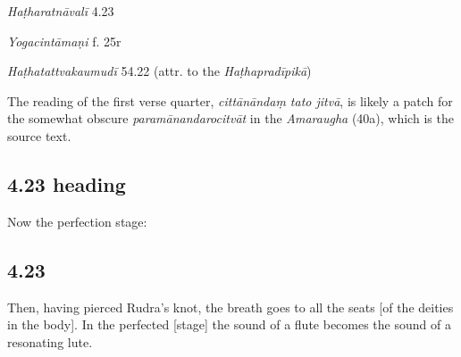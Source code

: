 \begin{ekdosis}
\begin{testimonia}[hp04_022]
\emph{Haṭharatnāvalī} 4.23
\begin{versinnote}
\end{versinnote}

\emph{Yogacintāmaṇi} f. 25r
\begin{versinnote}
\end{versinnote}

\emph{Haṭhatattvakaumudī} 54.22 (attr. to the \emph{Haṭhapradīpikā})
\begin{versinnote}
\end{versinnote}
\end{testimonia}

\begin{philcomm}[hp04_022]
The reading of the first verse quarter, \emph{cittānāndaṃ tato jitvā}, is likely a patch for the somewhat obscure \emph{paramānandarocitvāt} in the \emph{Amaraugha} (40a), which is the source text.
\end{philcomm}

\subsection*{4.23 heading}
\begin{translation}[hp04_023a]
Now the perfection stage:
\end{translation}


\subsection*{4.23}
\begin{translation}[hp04_023]
Then, having pierced Rudra's knot, the breath goes to all the seats [of the deities in the body]. In the perfected [stage] the sound of a flute becomes the sound of a resonating lute.
\end{translation}



\end{ekdosis}
